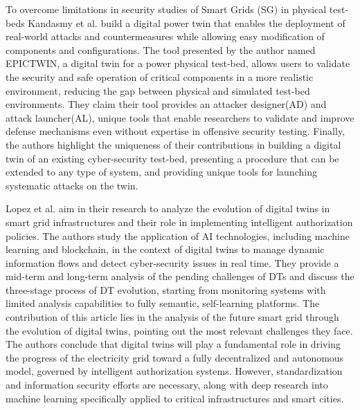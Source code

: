 To overcome limitations in security studies of Smart Grids (SG) in physical test-beds Kandasmy et al.\cite{kandasamyElectricPowerDigital2022} build a digital power twin that enables the deployment of real-world attacks and countermeasures while allowing easy modification of components and configurations. The tool presented by the author named EPICTWIN, a digital twin for a power physical test-bed, allows users to validate the security and safe operation of critical components in a more realistic environment, reducing the gap between physical and simulated test-bed environments. They claim their tool provides an attacker designer(AD) and attack launcher(AL), unique tools that enable researchers to validate and improve defense mechanisms even without expertise in offensive security testing. Finally, the authors highlight the uniqueness of their contributions in building a digital twin of an existing cyber-security test-bed, presenting a procedure that can be extended to any type of system, and providing unique tools for launching systematic attacks on the twin.

Lopez et al.\cite{lopezDIGITALTWINSINTELLIGENT2021} aim in their research to analyze the evolution of digital twins in smart grid infrastructures and their role in implementing intelligent authorization policies. The authors study the application of AI technologies, including machine learning and blockchain, in the context of digital twins to manage dynamic information flows and detect cyber-security issues in real time. They provide a mid-term and long-term analysis of the pending challenges of DTs and discuss the three-stage process of DT evolution, starting from monitoring systems with limited analysis capabilities to fully semantic, self-learning platforms. The contribution of this article lies in the analysis of the future smart grid through the evolution of digital twins, pointing out the most relevant challenges they face. The authors conclude that digital twins will play a fundamental role in driving the progress of the electricity grid toward a fully decentralized and autonomous model, governed by intelligent authorization systems. However, standardization and information security efforts are necessary, along with deep research into machine learning specifically applied to critical infrastructures and smart cities.


